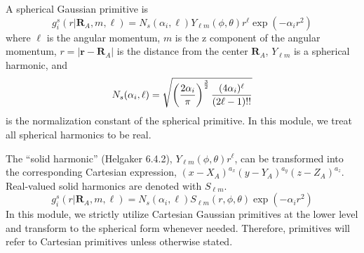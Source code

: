 \documentclass[letterpaper]{article}
\begin{document}
A spherical Gaussian primitive is
\begin{equation}
  \label{eq:sph_prim}
  g^s_i(r | \mathbf{R}_A, m, \ell) =
  N_s(\alpha_i, \ell)
  Y_{\ell m} (\phi, \theta)
  r^\ell
  \exp \left(-\alpha_i r^2 \right)
\end{equation}
where
$\ell$ is the angular momentum,
$m$ is the z component of the angular momentum,
$r = |\mathbf{r} - \mathbf{R}_A|$ is the distance from the center $\mathbf{R}_A$,
$Y_{\ell m}$ is a spherical harmonic,
and
\begin{equation}
  \label{eq:sph_norm}
  N_s (\alpha_i, \ell)
  = \sqrt{
    \left(
      \frac{2 \alpha_i}{\pi}
    \right)^{\frac{3}{2}}
    \frac{(4 \alpha_i)^{\ell}}{(2\ell - 1)!!}
  }\\
\end{equation}
is the normalization constant of the spherical primitive.
In this module, we treat all spherical harmonics to be real.

The ``solid harmonic'' (Helgaker 6.4.2), $Y_{\ell m} (\phi, \theta) r^\ell$, can
be transformed into the corresponding Cartesian expression,
$(x - X_A)^{a_x} (y - Y_A)^{a_y} (z - Z_A)^{a_z}$.
Real-valued solid harmonics are denoted with $S_{\ell m}$.
\begin{equation}
  \label{eq:sph_prim_2}
  g^s_i(r | \mathbf{R}_A, m, \ell) =
  N_s(\alpha_i, \ell)
  S_{\ell m} (r, \phi, \theta)
  \exp \left(-\alpha_i r^2 \right)
\end{equation}
In this module, we strictly utilize Cartesian Gaussian primitives at the lower
level and transform to the spherical form whenever needed.
Therefore, primitives will refer to Cartesian primitives unless otherwise stated.
\end{document}
